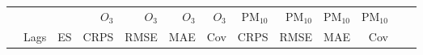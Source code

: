 \documentclass[alpha-refs]{wiley-article}
\begin{document}
\vspace{-3mm}
\begin{table}[H]
\centering
\scriptsize
\begin{tabular}{lllrrrrrrrrrr}
 & &  &  &  &  &  &  &  & & \\
 \hline
 & &   & $O_3$ & $O_3$  & $O_3$ & $O_3$ & $\text{PM}_{10}$ & $\text{PM}_{10}$  & $\text{PM}_{10}$ & $\text{PM}_{10}$ \\
  & Lags & ES & CRPS & RMSE  & MAE & Cov & CRPS & RMSE  & MAE & Cov \\
  \hline

\end{tabular}
\end{table}
\end{document}
